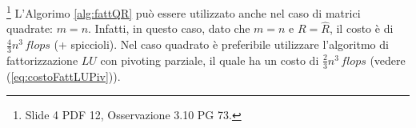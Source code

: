 \addtocounter{footnote}{-2}



\begin{remark}\footnote{Slide 4 PDF 12, Osservazione 3.10 PG 73.}
    L'Algorimo \ref{alg:fattQR} può essere utilizzato anche nel caso di matrici quadrate: $m=n.$ Infatti, in questo caso, dato che $m=n$ e $ R=\widehat R$, il costo è di $\frac{4}{3}n^3 \, flops$ (+ spiccioli). Nel caso quadrato è preferibile utilizzare l'algoritmo di fattorizzazione $LU$ con pivoting parziale, il quale ha un costo di $\frac{2}{3}n^3\, flops$ (vedere (\ref{eq:costoFattLUPiv})).
\end{remark}

